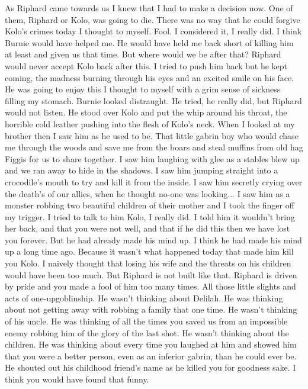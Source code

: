 As Riphard came towards us I knew that I had to make a decision now. One of them, Riphard or Kolo, was going to die. There was no way that he could forgive Kolo's crimes today I thought to myself. Fool. I considered it, I really did. I think Burnie would have helped me. He would have held me back short of killing him at least and given us that time. But where would we be after that? Riphard would never accept Kolo back after this. I tried to push him back but he kept coming, the madness burning through his eyes and an excited smile on his face. He was going to enjoy this I thought to myself with a grim sense of sickness filling my stomach. Burnie looked distraught. He tried, he really did, but Riphard would not listen. He stood over Kolo and put the whip around his throat, the horrible cold leather pushing into the flesh of Kolo's neck. When I looked at my brother then I saw him as he used to be. That little gabrin boy who would chase me through the woods and save me from the boars and steal muffins from old hag Figgis for us to share together. I saw him laughing with glee as a stables blew up and we ran away to hide in the shadows. I saw him jumping straight into a crocodile's mouth to try and kill it from the inside. I saw him secretly crying over the death's of our allies, when he thought no-one was looking... I saw him as a monster robbing two beautiful children of their mother and I took the finger off my trigger. I tried to talk to him Kolo, I really did. I told him it wouldn't bring her back, and that you were not well, and that if he did this then we have lost you forever. But he had already made his mind up. I think he had made his mind up a long time ago. Because it wasn't what happened today that made him kill you Kolo. I naively thought that losing his wife and the threats on his children would have been too much. But Riphard is not built like that. Riphard is driven by pride and you made a fool of him too many times. All those little slights and acts of one-upgoblinship. He wasn't thinking about Delilah. He was thinking about not getting away with robbing a family that one time. He wasn't thinking of his uncle. He was thinking of all the times you saved us from an impossible enemy robbing him of the glory of the last shot. He wasn't thinking about the children. He was thinking about every time you laughed at him and showed him that you were a better person, even as an inferior gabrin, than he could ever be. He shouted out his childhood friend's name as he killed you for goodness sake. I think you would have found that funny.\medskip

